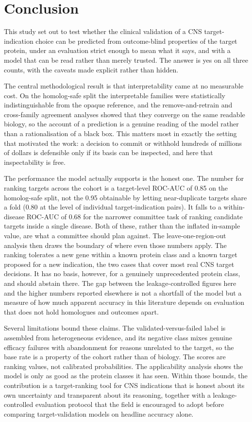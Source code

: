 \documentclass[11pt,twocolumn]{article}
\begin{document}
\section{Conclusion}

This study set out to test whether the clinical validation of a CNS target-indication choice can be predicted from outcome-blind properties of the target protein, under an evaluation strict enough to mean what it says, and with a model that can be read rather than merely trusted. The answer is yes on all three counts, with the caveats made explicit rather than hidden.

The central methodological result is that interpretability came at no measurable cost. On the homolog-safe split the interpretable families were statistically indistinguishable from the opaque reference, and the remove-and-retrain and cross-family agreement analyses showed that they converge on the same readable biology, so the account of a prediction is a genuine reading of the model rather than a rationalisation of a black box. This matters most in exactly the setting that motivated the work: a decision to commit or withhold hundreds of millions of dollars is defensible only if its basis can be inspected, and here that inspectability is free.

The performance the model actually supports is the honest one. The number for ranking targets across the cohort is a target-level ROC-AUC of 0.85 on the homolog-safe split, not the 0.95 obtainable by letting near-duplicate targets share a fold (0.80 at the level of individual target-indication pairs). It falls to a within-disease ROC-AUC of 0.68 for the narrower committee task of ranking candidate targets inside a single disease. Both of these, rather than the inflated in-sample value, are what a committee should plan against. The leave-one-region-out analysis then draws the boundary of where even those numbers apply. The ranking tolerates a new gene within a known protein class and a known target proposed for a new indication, the two cases that cover most real CNS target decisions. It has no basis, however, for a genuinely unprecedented protein class, and should abstain there. The gap between the leakage-controlled figures here and the higher numbers reported elsewhere is not a shortfall of the model but a measure of how much apparent accuracy in this literature depends on evaluation that does not hold homologues and outcomes apart.

Several limitations bound these claims. The validated-versus-failed label is assembled from heterogeneous evidence, and its negative class mixes genuine efficacy failures with abandonment for reasons unrelated to the target, so the base rate is a property of the cohort rather than of biology. The scores are ranking values, not calibrated probabilities. The applicability analysis shows the model is only as good as the protein classes it has seen. Within those bounds, the contribution is a target-ranking tool for CNS indications that is honest about its own uncertainty and transparent about its reasoning, together with a leakage-controlled evaluation protocol that the field is encouraged to adopt before comparing target-validation models on headline accuracy alone.
\end{document}
